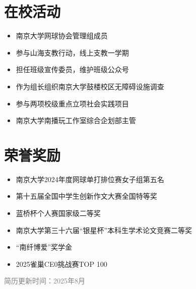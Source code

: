 \documentclass[a4paper,11pt]{ctexart}
\begin{document}
\section*{在校活动}
\begin{itemize}[leftmargin=*,itemsep=0.3em]
    \item 南京大学网球协会管理组成员
    \item 参与山海支教行动，线上支教一学期
    \item 担任班级宣传委员，维护班级公众号
    \item 作为组长组织南京大学鼓楼校区无障碍设施调查
    \item 参与两项校级重点立项社会实践项目
    \item 南京大学南播玩工作室综合企划部主管
\end{itemize}

\section*{荣誉奖励}
\begin{itemize}[leftmargin=*,itemsep=0.3em]
    \item 南京大学2024年度网球单打排位赛女子组第五名
    \item 第十五届全国中学生创新作文大赛全国特等奖
    \item 蓝桥杯个人赛国家级二等奖
    \item 南京大学第三十六届“银星杯”本科生学术论文竞赛二等奖
    \item “南纤博爱”奖学金
    \item 2025雀巢CE0挑战赛TOP 100
\end{itemize}

\vspace{2mm}
\begin{center}
    \textcolor{gray}{\footnotesize 简历更新时间：2025年8月}
\end{center}
\end{document}
